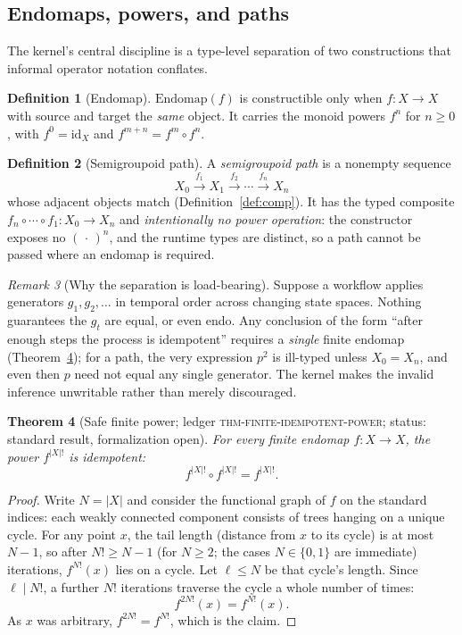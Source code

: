 \documentclass[11pt]{amsart}
\newtheorem{theorem}{Theorem}[section]
\theoremstyle{definition}
\newtheorem{definition}[theorem]{Definition}
\theoremstyle{remark}
\newtheorem{remark}[theorem]{Remark}
\newcommand{\id}{\mathrm{id}}
\begin{document}
\subsection{Endomaps, powers, and paths}\label{sec:powers}

The kernel's central discipline is a type-level separation of two constructions that informal operator notation conflates.

\begin{definition}[Endomap]\label{def:endomap}
$\mathrm{Endomap}(f)$ is constructible only when $f:X\to X$ with source and target the \emph{same} object. It carries the monoid powers $f^n$ for $n\ge 0$, with $f^0=\id_X$ and $f^{m+n}=f^m\circ f^n$.
\end{definition}

\begin{definition}[Semigroupoid path]\label{def:path}
A \emph{semigroupoid path} is a nonempty sequence
\[
X_0\xrightarrow{f_1}X_1\xrightarrow{f_2}\cdots\xrightarrow{f_n}X_n
\]
whose adjacent objects match (Definition~\ref{def:comp}). It has the typed composite $f_n\circ\cdots\circ f_1:X_0\to X_n$ and \emph{intentionally no power operation}: the constructor exposes no $(\,\cdot\,)^n$, and the runtime types are distinct, so a path cannot be passed where an endomap is required.
\end{definition}

\begin{remark}[Why the separation is load-bearing]
Suppose a workflow applies generators $g_1,g_2,\dots$ in temporal order across changing state spaces. Nothing guarantees the $g_t$ are equal, or even endo. Any conclusion of the form ``after enough steps the process is idempotent'' requires a \emph{single} finite endomap (Theorem~\ref{thm:factorial}); for a path, the very expression $p^2$ is ill-typed unless $X_0=X_n$, and even then $p$ need not equal any single generator. The kernel makes the invalid inference unwritable rather than merely discouraged.
\end{remark}

\begin{theorem}[Safe finite power; \textnormal{ledger \textsc{thm-finite-idempotent-power}; status: standard result, formalization open}]\label{thm:factorial}
For every finite endomap $f:X\to X$, the power $f^{|X|!}$ is idempotent:
\[
f^{|X|!}\circ f^{|X|!}=f^{|X|!}.
\]
\end{theorem}

\begin{proof}
Write $N=|X|$ and consider the functional graph of $f$ on the standard indices: each weakly connected component consists of trees hanging on a unique cycle. For any point $x$, the tail length (distance from $x$ to its cycle) is at most $N-1$, so after $N!\ge N-1$ (for $N\ge 2$; the cases $N\in\{0,1\}$ are immediate) iterations, $f^{N!}(x)$ lies on a cycle. Let $\ell\le N$ be that cycle's length. Since $\ell\mid N!$, a further $N!$ iterations traverse the cycle a whole number of times:
\[
f^{2N!}(x)=f^{N!}(x).
\]
As $x$ was arbitrary, $f^{2N!}=f^{N!}$, which is the claim.
\end{proof}
\end{document}
